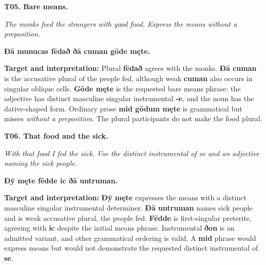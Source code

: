 \par\begin{minipage}{\linewidth}\raggedright
\textbf{T05. Bare means.}

\emph{The monks feed the strangers with good food. Express the means without a preposition.}

\textbf{Ðā munucas fēdað ðā cuman gōde męte.}

\textbf{Target and interpretation:} Plural \textbf{fēdað} agrees with the monks. \textbf{Ðā cuman} is the accusative plural of the people fed, although weak \textbf{cuman} also occurs in singular oblique cells. \textbf{Gōde męte} is the requested bare means phrase: the adjective has distinct masculine singular instrumental \textbf{-e}, and the noun has the dative-shaped form. Ordinary prose \textbf{mid gōdum męte} is grammatical but misses \emph{without a preposition}. The plural participants do not make the food plural.

\end{minipage}\par\addvspace{4pt}

\par\begin{minipage}{\linewidth}\raggedright
\textbf{T06. That food and the sick.}

\emph{With that food I fed the sick. Use the distinct instrumental of se and an adjective naming the sick people.}

\textbf{Ðȳ męte fēdde ic ðā untruman.}

\textbf{Target and interpretation:} \textbf{Ðȳ męte} expresses the means with a distinct masculine singular instrumental determiner. \textbf{Ðā untruman} names sick people and is weak accusative plural, the people fed. \textbf{Fēdde} is first-singular preterite, agreeing with \textbf{ic} despite the initial means phrase. Instrumental \textbf{ðon} is an admitted variant, and other grammatical ordering is valid. A \textbf{mid} phrase would express means but would not demonstrate the requested distinct instrumental of \textbf{se}.

\end{minipage}\par\addvspace{4pt}

